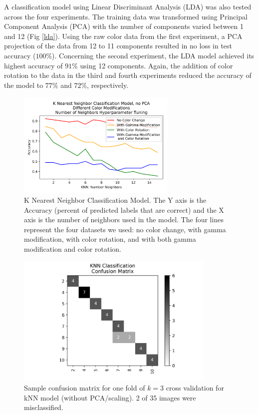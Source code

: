 \documentclass[journal]{IEEEtran}
\begin{document}
A classification model using Linear Discriminant Analysis (LDA) was also tested across the four experiments. The training data was transformed using Principal Component Analysis (PCA) with the number of components varied between 1 and 12 (Fig \ref{lda}). Using the raw color data from the first experiment, a PCA projection of the data from 12 to 11 components resulted in no loss in test accuracy ($100\%$). Concerning the second experiment, the LDA model achieved its highest accuracy of $91\%$ using 12 components. Again, the addition of color rotation to the data in the third and fourth experiments reduced the accuracy of the model to $77\%$ and $72\%$, respectively.

\begin{figure}
\centering
\includegraphics[height=2in]{KNN_clf_noPCA/knn_classification.png}
\caption{K Nearest Neighbor Classification Model. The Y axis is the Accuracy (percent of predicted labels that are correct) and the X axis is the number of neighbors used in the model. The four lines represent the four datasets we used: no color change, with gamma modification, with color rotation, and with both gamma modification and color rotation.}
\label{knn}
\end{figure}

\begin{figure}
\centering
\includegraphics[height=2.5in]{KNN_clf_noPCA/KNN_classification_cfm.png}
\caption{Sample confusion matrix for one fold of $k=3$ cross validation for kNN model (without PCA/scaling). 2 of 35 images were misclassified.}
\label{knn_confusion}
\end{figure}
\end{document}
